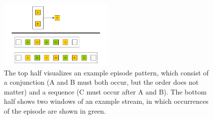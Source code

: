 \begin{figure}[h]
	\centering
  	\includegraphics[width=0.5\textwidth]{exampleEpisode.jpg}
	\caption[Example Episode Pattern and Occurrences]{The top half visualizes an example episode pattern, which consist of a conjunction (A and B must both occur, but the order does not matter) and a sequence (C must occur after A and B). The bottom half shows two windows of an example stream, in which occurrences of the episode are shown in green.}
	\label{fig_simpleEpisodeExample}
\end{figure}

